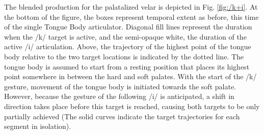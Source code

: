 The blended production for the palatalized velar is depicted in Fig.
\ref{fig:/k+i}. At the bottom of the figure, the boxes represent
temporal extent as before, this time of the single Tongue Body articulator.
Diagonal fill lines represent the duration when the {/k/}
target is active, and the semi-opaque white, the duration of the active
{/i/} articulation. Above, the trajectory of the highest
point of the tongue body relative to the two target locations is indicated
by the dotted line. The tongue body is assumed to start from a resting
position that places its highest point somewhere in between the hard
and soft palates. With the start of the {/k/} gesture, movement
of the tongue body is initiated towards the soft palate. However,
because the gesture of the following {/i/} is anticipated,
a shift in direction takes place before this target is reached, causing
both targets to be only partially achieved (The solid curves indicate
the target trajectories for each segment in isolation). 

